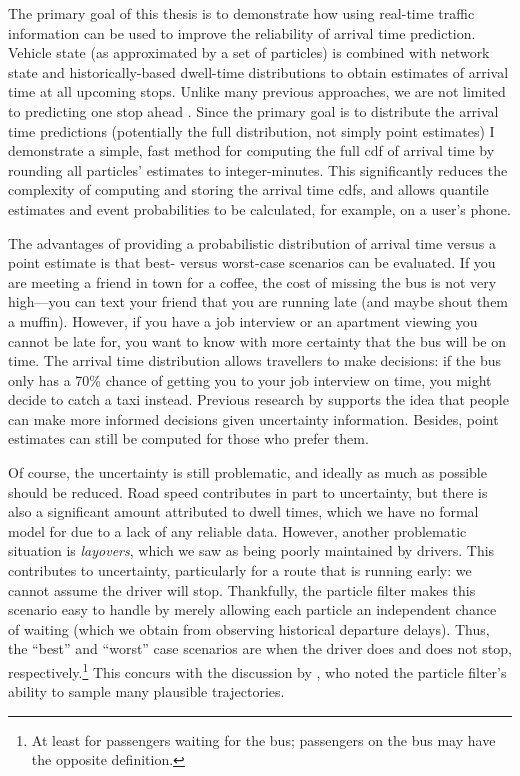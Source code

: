 The primary goal of this thesis is to demonstrate how using real-time traffic information can be used to improve the reliability of arrival time prediction. Vehicle state (as approximated by a set of particles) is combined with network state and historically-based dwell-time distributions to obtain estimates of arrival time at all upcoming stops. Unlike many previous approaches, we are not limited to predicting one stop ahead \citep{Yu_2011}. Since the primary goal is to distribute the arrival time predictions (potentially the full distribution, not simply point estimates) I demonstrate a simple, fast method for computing the full \gls{cdf} of arrival time by rounding all particles' estimates to integer-minutes. This significantly reduces the complexity of computing and storing the arrival time \glspl{cdf}, and allows quantile estimates and event probabilities to be calculated, for example, on a user's phone.


The advantages of providing a probabilistic distribution of arrival time versus a point estimate is that best- versus worst-case scenarios can be evaluated. If you are meeting a friend in town for a coffee, the cost of missing the bus is not very high---you can text your friend that you are running late (and maybe shout them a muffin). However, if you have a job interview or an apartment viewing you cannot be late for, you want to know with more certainty that the bus will be on time. The arrival time distribution allows travellers to make decisions: if the bus only has a 70\% chance of getting you to your job interview on time, you might decide to catch a taxi instead. Previous research by \citet{Fernandes_2018} supports the idea that people can make more informed decisions given uncertainty information. Besides, point estimates can still be computed for those who prefer them.


Of course, the uncertainty is still problematic, and ideally as much as possible should be reduced. Road speed contributes in part to uncertainty, but there is also a significant amount attributed to dwell times, which we have no formal model for due to a lack of any reliable data. However, another problematic situation is \emph{layovers}, which we saw as being poorly maintained by drivers. This contributes to uncertainty, particularly for a route that is running early: we cannot assume the driver will stop. Thankfully, the particle filter makes this scenario easy to handle by merely allowing each particle an independent chance of waiting (which we obtain from observing historical departure delays). Thus, the ``best'' and ``worst'' case scenarios are when the driver does and does not stop, respectively.\footnote{At least for passengers waiting for the bus; passengers on the bus may have the opposite definition.} This concurs with the discussion by \citet{Hans_2015}, who noted the particle filter's ability to sample many plausible trajectories.


